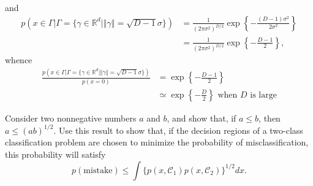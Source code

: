 \begin{enumerate}[leftmargin={*}]
\[\]
 and 
\begin{align*}
p(x\in\Gamma\vert\Gamma=\{\gamma\in\mathbb{R}^{d}\vert\left\Vert \gamma\right\Vert =\sqrt{D-1}\sigma\}) & =\frac{1}{(2\pi\sigma^{2})^{D/2}}\exp\left\{ -\frac{(D-1)\sigma^{2}}{2\sigma^{2}}\right\} \\
 & =\frac{1}{(2\pi\sigma^{2})^{D/2}}\exp\left\{ -\frac{D-1}{2}\right\} ,
\end{align*}
whence 
\begin{align*}
\frac{p(x\in\Gamma\vert\Gamma=\{\gamma\in\mathbb{R}^{d}\vert\left\Vert \gamma\right\Vert =\sqrt{D-1}\sigma\})}{p(x=0)} & =\exp\left\{ -\frac{D-1}{2}\right\} \\
 & \simeq\exp\left\{ -\frac{D}{2}\right\} \text{ when }D\text{ is large}
\end{align*}
\end{enumerate}
\begin{cBoxA}{}
 Consider two nonnegative numbers $a$ and $b$, and show that, if
$a\leq b$, then $a\leq(ab)^{1/2}$. Use this result to show that,
if the decision regions of a two-class classification problem are
chosen to minimize the probability of misclassification, this probability
will satisfy
\[
p(\mathrm{mistake})\leq\int\{p(x,\mathcal{C}_{1})p(x,\mathcal{C}_{2})\}^{1/2}dx.
\]
\end{cBoxA}

